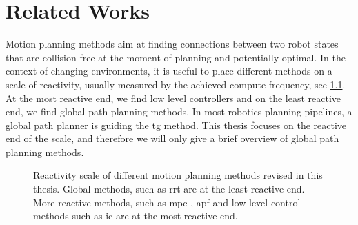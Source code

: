 \chapter{Related Works} %
\label{cha:state}

\blfootnote{
  \partscontentfootnote
  \begin{itemize}
    \item \trodynamic
    \item \icraautotuning
    \item \icracoupled
  \end{itemize}
}





\newpage


Motion planning methods aim at finding connections between two
robot states
that are collision-free at the
moment of planning and potentially optimal.
In the context of changing environments, 
it is useful to place different methods
on a scale of reactivity, usually measured by the achieved
compute frequency, see \cref{fig:reactivity_scale}.
At the most reactive end, we find low
level controllers and on the least reactive end, we find
global path planning methods. In most robotics planning
pipelines, a global path planner is guiding the 
\ac{tg} method.
This thesis focuses on the reactive end of the scale, and
therefore we will only give a brief overview of global path
planning methods. 
%
\begin{figure}[h]
  \centering
  
  \caption{Reactivity scale of different motion planning methods
  revised in this thesis. Global methods, such as \ac{rrt}
  \cite{Karaman2011} are at the least reactive end. More
  reactive methods, such as \ac{mpc}
  \cite{hewing2020learning}, \ac{apf} \cite{Khatib1985} and
  low-level control methods such as \ac{ic} \cite{hogan1985impedance}
  are at the most reactive end.}
  \label{fig:reactivity_scale}
\end{figure}

